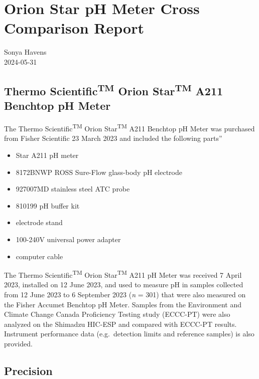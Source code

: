 \documentclass[
]{article}
\author{}
\date{\vspace{-2.5em}2024-05-15}
\providecommand{\tightlist}{%
  \setlength{\itemsep}{0pt}\setlength{\parskip}{0pt}}
\begin{document}
\hypertarget{orion-star-ph-meter-cross-comparison-report}{%
\section{Orion Star pH Meter Cross Comparison
Report}\label{orion-star-ph-meter-cross-comparison-report}}

Sonya Havens\\
2024-05-31

\hypertarget{thermo-scientifictm-orion-startm-a211-benchtop-ph-meter}{%
\subsection{\texorpdfstring{Thermo Scientific\textsuperscript{TM} Orion
Star\textsuperscript{TM} A211 Benchtop pH
Meter}{Thermo ScientificTM Orion StarTM A211 Benchtop pH Meter}}\label{thermo-scientifictm-orion-startm-a211-benchtop-ph-meter}}

The Thermo Scientific\textsuperscript{TM} Orion Star\textsuperscript{TM}
A211 Benchtop pH Meter was purchased from Fisher Scientific 23 March
2023 and included the following parts''

\begin{itemize}
\tightlist
\item
  Star A211 pH meter
\item
  8172BNWP ROSS Sure-Flow glass-body pH electrode
\item
  927007MD stainless steel ATC probe
\item
  810199 pH buffer kit
\item
  electrode stand
\item
  100-240V universal power adapter
\item
  computer cable
\end{itemize}

The Thermo Scientific\textsuperscript{TM} Orion Star\textsuperscript{TM}
A211 pH Meter was received 7 April 2023, installed on 12 June 2023, and
used to measure pH in samples collected from 12 June 2023 to 6 September
2023 (\emph{n} = 301) that were also measured on the Fisher Accumet
Benchtop pH Meter. Samples from the Environment and Climate Change
Canada Proficiency Testing study (ECCC-PT) were also analyzed on the
Shimadzu HIC-ESP and compared with ECCC-PT results. Instrument
performance data (e.g.~detection limits and reference samples) is also
provided.

\hypertarget{precision}{%
\subsection{Precision}\label{precision}}
\end{document}
